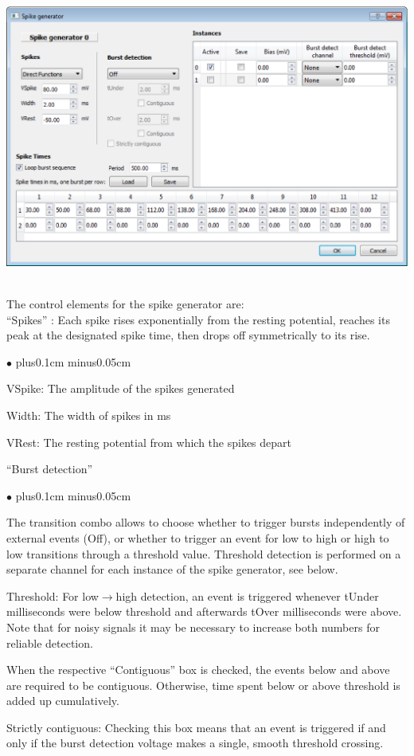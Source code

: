 \documentclass{article}
\newenvironment{myitem}{\begin{list}{$\bullet$}{\setlength{\leftmargin}{1.1em}
\itemsep0.1cm plus0.1cm minus0.05cm
\listparindent0cm
\addtolength{\labelsep}{0.5\labelsep}
\setlength{\labelwidth}{0.8em}
\setlength{\leftmargin}{\labelwidth}
\addtolength{\leftmargin}{\labelsep}
}}{\end{list}}
\begin{document}
\noindent
\parbox{\textwidth}{
	\includegraphics[scale=0.5]{spikeGenBlock}
} \\[0.2cm]

The control elements for the spike generator are: \\

``Spikes'' : Each spike rises exponentially from the resting potential, reaches its peak
at the designated spike time, then drops off symmetrically to its rise.
\begin{myitem}
	\item VSpike: The amplitude of the spikes generated
	\item Width: The width of spikes in ms
	\item VRest: The resting potential from which the spikes depart
\end{myitem}

``Burst detection''
\begin{myitem}
	\item The transition combo allows to choose whether to trigger bursts
	independently of external events (Off), or whether to trigger an
	event for low to high or high to low transitions through a threshold
	value. Threshold detection is performed on a separate channel for each
	instance of the spike generator, see below.
	\item Threshold: For low$\rightarrow$high detection, an event
	is triggered whenever tUnder milliseconds were below threshold and
	afterwards tOver milliseconds were above. Note that for noisy
	signals it may be  necessary to increase both numbers for reliable
	detection.
	\item When the respective ``Contiguous'' box is checked, the events
	below and above are required to be contiguous. Otherwise, time spent
	below or above threshold is added up cumulatively.
	\item Strictly contiguous: Checking this box means that an event is
	triggered if and only if the burst detection voltage makes a single,
	smooth threshold crossing.
\end{myitem}
\end{document}
